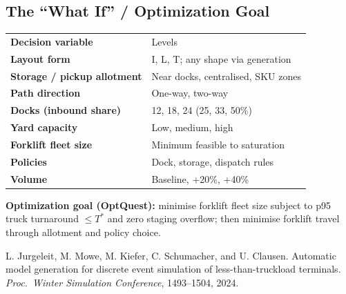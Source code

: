 \documentclass[10pt]{selfArx}
\begin{document}
\subsection*{The ``What If'' / Optimization Goal}
{\small
\renewcommand{\arraystretch}{1.12}
\setlength{\tabcolsep}{3pt}
\noindent\begin{tabularx}{\columnwidth}{>{\bfseries}P{2.9cm}L}
 Decision variable & Levels \\
Layout form                & I, L, T; any shape via generation \\
Storage / pickup allotment & Near docks, centralised, SKU zones \\
Path direction             & One-way, two-way \\
Docks (inbound share)      & 12, 18, 24 (25, 33, 50\%) \\
Yard capacity              & Low, medium, high \\
Forklift fleet size        & Minimum feasible to saturation \\
Policies                   & Dock, storage, dispatch rules \\
Volume                     & Baseline, +20\%, +40\% \\
\end{tabularx}}

\vspace{4pt}
\noindent\colorbox{color2!10}{\parbox{\dimexpr\columnwidth-2\fboxsep\relax}{\small
\textbf{Optimization goal (OptQuest):} minimise forklift fleet size subject to p95 truck turnaround $\leq T^{*}$ and zero staging overflow; then minimise forklift travel through allotment and policy choice.}}

\begin{thebibliography}{9}\small
{} L. Jurgeleit, M. Mowe, M. Kiefer, C. Schumacher, and U. Clausen. Automatic model generation for discrete event simulation of less-than-truckload terminals. \textit{Proc.\ Winter Simulation Conference}, 1493--1504, 2024.
\end{thebibliography}
\end{document}
